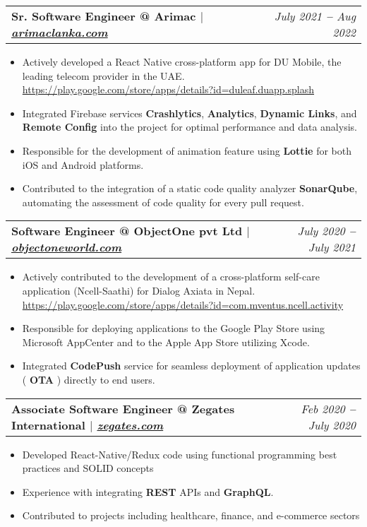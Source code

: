 \documentclass[letterpaper,11pt]{article}
\makeatletter
\newcommand{\resumeItem}[1]{
  \item\small{
    {#1 \vspace{-2pt}}
  }
}
\newcommand{\resumeSubheading}[2]{
  \vspace{-2pt}\item
    \begin{tabular*}{0.97\textwidth}[t]{l@{\extracolsep{\fill}}r}
      \textbf{\small#1} & \textit{\small #2} \\
    \end{tabular*}\vspace{-7pt}
}
\newcommand{\resumeItemListStart}{\begin{itemize}}
\newcommand{\resumeItemListEnd}{\end{itemize}\vspace{-5pt}}
\makeatother
\begin{document}
    \resumeSubheading
      {Sr. Software Engineer @ Arimac $|$  \footnotesize{\emph{\href{https://arimaclanka.com}{arimaclanka.com}}}}{\color{NavyBlue}July 2021 \textbf{--} Aug 2022}
      \vspace{4pt}
        \resumeItemListStart
            \resumeItem{Actively developed a React Native cross-platform app for DU Mobile, the leading telecom provider in the UAE.}\href{https://play.google.com/store/apps/details?id=duleaf.duapp.splash}{\color{NavyBlue}https://play.google.com/store/apps/details?id=duleaf.duapp.splash}
            \resumeItem{Integrated Firebase services \textbf{Crashlytics}, \textbf{Analytics}, \textbf{Dynamic Links}, and \textbf{Remote Config} into the project for optimal performance and data analysis.}
            \resumeItem{Responsible for the development of  animation feature using \textbf{Lottie} for both iOS and Android platforms.}
            \resumeItem{Contributed to the integration of a static code quality analyzer \textbf{SonarQube}, automating the assessment of code quality for every pull request.}
        \resumeItemListEnd
        \vspace{16pt}

    \resumeSubheading
      {Software Engineer @ ObjectOne pvt Ltd $|$  \footnotesize{\emph{\href{https://www.objectoneworld.com}{objectoneworld.com}}}}{\color{NavyBlue}July 2020 \textbf{--} July 2021}
      \vspace{4pt}
        \resumeItemListStart
            \resumeItem{Actively contributed to the development of a cross-platform self-care application (Ncell-Saathi) for Dialog Axiata in Nepal.}\href{https://play.google.com/store/apps/details?id=com.mventus.ncell.activity}{\color{NavyBlue}https://play.google.com/store/apps/details?id=com.mventus.ncell.activity}
            \resumeItem{Responsible for deploying applications to the Google Play Store using Microsoft AppCenter and to the Apple App Store utilizing Xcode.}
            \resumeItem{Integrated \textbf{CodePush} service for seamless deployment of application updates ( \textbf{OTA} ) directly to end users.}
        \resumeItemListEnd
        \vspace{16pt}

    \resumeSubheading
      {Associate Software Engineer @ Zegates International $|$ \footnotesize{\emph{\href{https://zegates.com/}{zegates.com}}}}{\color{NavyBlue}Feb 2020 \textbf{--} July 2020}
      \vspace{4pt}
        \resumeItemListStart
            \resumeItem{Developed React-Native/Redux code using functional programming best practices and SOLID concepts}
            \resumeItem{Experience with integrating \textbf{REST} APIs and  \textbf{GraphQL}.}
            \resumeItem{Contributed to projects including healthcare, finance, and e-commerce sectors}
        \resumeItemListEnd
        \vspace{16pt}
\end{document}
